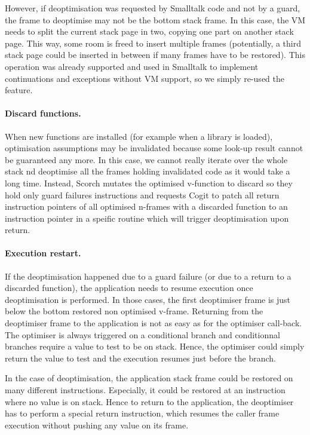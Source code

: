 \documentclass[a4paper,12pt,twoside]{../includes/ThesisStyle}
\begin{document}
However, if deoptimisation was requested by Smalltalk code and not by a guard, the frame to deoptimise may not be the bottom stack frame. In this case, the VM needs to split the current stack page in two, copying one part on another stack page. This way, some room is freed to insert multiple frames (potentially, a third stack page could be inserted in between if many frames have to be restored). This operation was already supported and used in Smalltalk to implement continuations and exceptions without VM support, so we simply re-used the feature.

\paragraph{Discard functions.} When new functions are installed (for example when a library is loaded), optimisation assumptions may be invalidated because some look-up result cannot be guaranteed any more. In this case, we cannot really iterate over the whole stack nd deoptimise all the frames holding invalidated code as it would take a long time. Instead, Scorch mutates the optimised v-function to discard so they hold only guard failures instructions and requests Cogit to patch all return instruction pointers of all optimised n-frames with a discarded function to an instruction pointer in a speific routine which will trigger deoptimisation upon return.

\paragraph{Execution restart.}

If the deoptimisation happened due to a guard failure (or due to a return to a discarded function), the application needs to resume execution once deoptimisation is performed. In those cases, the first deoptimiser frame is just below the bottom restored non optimised v-frame. Returning from the deoptimiser frame to the application is not as easy as for the optimiser call-back. The optimiser is always triggered on a conditional branch and conditionnal branches require a value to test to be on stack. Hence, the optimiser could simply return the value to test and the execution resumes just before the branch. 

In the case of deoptimisation, the application stack frame could be restored on many different instructions. Especially, it could be restored at an instruction where no value is on stack. Hence to return to the application, the deoptimiser has to perform a special return instruction, which resumes the caller frame execution without pushing any value on its frame.




\ifx\wholebook\relax\else
    
\end{document}

